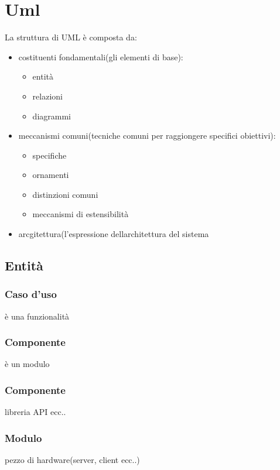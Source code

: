 \documentclass{report}
\begin{document}
    \chapter{Uml}
        La struttura di UML è composta da:
        \begin{itemize}
            \item costituenti fondamentali(gli elementi di base):
                \begin{itemize}
                    \item entità
                    \item relazioni 
                    \item diagrammi
                \end{itemize}
            \item meccanismi comuni(tecniche comuni per raggiongere specifici obiettivi):
                \begin{itemize}
                    \item specifiche
                    \item ornamenti 
                    \item distinzioni comuni
                    \item meccanismi di estensibilità
                \end{itemize}
            \item  arcgitettura(l'espressione dellarchitettura del sistema      
        \end{itemize}
        
        \section{Entità}
            
            \subsection{Caso d'uso}
                è una funzionalità
            \subsection{Componente}
                è un modulo
            \subsection{Componente}
                libreria API ecc..
            \subsection{Modulo}
                pezzo di hardware(server, client ecc..)
\end{document}
